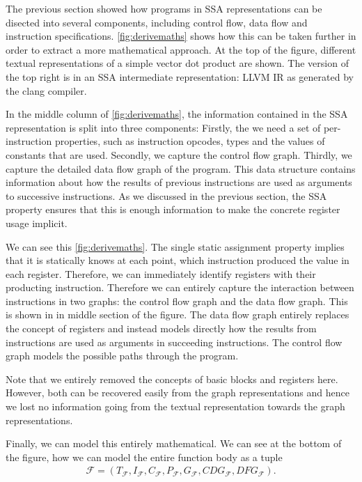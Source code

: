     The previous section showed how programs in SSA representations can be
    disected into several components, including control flow, data flow and
    instruction specifications.
    \autoref{fig:derivemaths} shows how this can be taken further in order to
    extract a more mathematical approach.
    At the top of the figure, different textual representations of a simple
    vector dot product are shown.
    The version of the top right is in an SSA intermediate representation: LLVM
    IR as generated by the clang compiler.

    In the middle column of \autoref{fig:derivemaths}, the information
    contained in the SSA representation is split into three components:
    Firstly, the we need a set of per-instruction properties, such as
    instruction opcodes, types and the values of constants that are used.
    Secondly, we capture the control flow graph.
    Thirdly, we capture the detailed data flow graph of the program.
    This data structure contains information about how the results of previous
    instructions are used as arguments to successive instructions.
    As we discussed in the previous section, the SSA property ensures that this
    is enough information to make the concrete register usage implicit.

    We can see this \autoref{fig:derivemaths}.
    The single static assignment property implies that it is statically knows
    at each point, which instruction produced the value in each register.
    Therefore, we can immediately identify registers with their producting
    instruction.
    Therefore we can entirely capture the interaction between instructions in
    two graphs: the control flow graph and the data flow graph.
    This is shown in in middle section of the figure.
    The data flow graph entirely replaces the concept of registers and instead
    models directly how the results from instructions are used as arguments
    in succeeding instructions.
    The control flow graph models the possible paths through the program.

    Note that we entirely removed the concepts of basic blocks and registers
    here.
    However, both can be recovered easily from the graph representations and
    hence we lost no information going from the textual representation towards
    the graph representations.

    Finally, we can model this entirely mathematical.
    We can see at the bottom of the figure, how we can model the entire function
    body as a tuple
    \begin{align*}
        \mathcal{F}=(T_\mathcal{F},I_\mathcal{F},C_\mathcal{F},P_\mathcal{F},G_\mathcal{F},CDG_\mathcal{F},DFG_\mathcal{F})\text{.}
    \end{align*}

